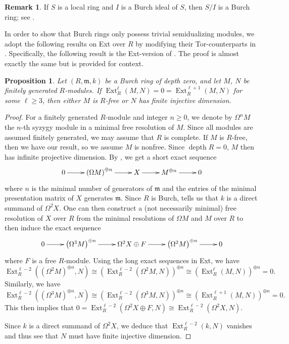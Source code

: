 \documentclass{amsart}
\newcommand{\depth}[1]{\operatorname{depth} {#1}}
\newcommand{\m}{\mathfrak{m}}
\DeclareMathOperator{\Ext}{Ext}
\theoremstyle{plain}
\newtheorem{prop}[theorem]{Proposition}
\theoremstyle{definition}
\newtheorem{remark}[theorem]{Remark}
\numberwithin{theorem}{section}
\numberwithin{equation}{section}
\numberwithin{equation}{theorem}
\begin{document}
\begin{remark} \label{burchideal}
If $S$ is a local ring and $I$ is a Burch ideal of $S$, then $S/I$ is a Burch ring; see \cite[Remark~2.9]{DKT}. 
\end{remark}


In order to show that Burch rings only possess trivial semidualizing modules, we adopt the following results on Ext over $R$ by modifying their Tor-counterparts in \cite{DKT}. Specifically, the following result is the Ext-version of \cite[Proposition 7.12]{DKT}. The proof is almost exactly the same but is provided for context.

\begin{prop}\label{prop:BurchExt}
Let $(R, \m, k)$ be a Burch ring of depth zero, and let $M$, $N$ be finitely generated $R$-modules. If $\Ext_R^{\ell}(M,N) = 0 = \Ext_R^{\ell + 1}(M,N)$ for some $\ell \geq 3$, then either $M$ is $R$-free or $N$ has finite injective dimension.
\end{prop}

\begin{proof}
For a finitely generated $R$-module and integer $n\ge 0$, we denote by $\Omega^n M$ the $n$-th syzygy module in a minimal free resolution of $M$. Since all modules are assumed finitely generated, we may assume that $R$ is complete. If $M$ is $R$-free, then we have our result, so we assume $M$ is nonfree. Since $\depth{R} = 0$, $M$ then has infinite projective dimension. By \cite[Lemma 7.4]{DKT}, we get a short exact sequence
\[\xymatrix{
0 \ar[r] & \left(\Omega M\right)^{\oplus n} \ar[r] & X \ar[r] & M^{\oplus n} \ar[r] & 0
}\]
where $n$ is the minimal number of generators of $\m$ and the entries of the minimal presentation matrix of $X$ generates $ \m$. Since $R$ is Burch, \cite[Proposition 4.2]{DKT} tells us that $k$ is a direct summand of $\Omega^2 X$. One can then construct a (not necessarily minimal) free resolution of $X$ over $R$ from the minimal resolutions of $\Omega M$ and $M$ over $R$ to then induce the exact sequence
\[\xymatrix{
0 \ar[r] & \left(\Omega^3 M \right)^{\oplus n} \ar[r] & \Omega^2 X \oplus F \ar[r] & \left(\Omega^2 M\right)^{\oplus n} \ar[r] & 0
}\]
where $F$ is a free $R$-module. Using the long exact sequences in Ext, we have \[\Ext_R^{\ell - 2}\left(\left(\Omega^2 M\right)^{\oplus n},N\right) \cong \left( \Ext_R^{\ell - 2} \left( \Omega^2 M, N\right) \right)^{\oplus n} \cong \left( \Ext_R^{\ell} \left(M, N \right) \right)^{\oplus n} = 0. \] Similarly, we have \[\Ext_R^{\ell - 2}\left(\left(\Omega^3 M\right)^{\oplus n},N\right) \cong \left( \Ext_R^{\ell - 2} \left( \Omega^3 M, N\right) \right)^{\oplus n} \cong \left( \Ext_R^{\ell + 1} \left(M, N \right) \right)^{\oplus n} = 0. \] This then implies that
$0 = \Ext_R^{\ell - 2}\left( \Omega^2 X \oplus F, N \right)\cong \Ext_R^{\ell - 2}\left( \Omega^2 X, N \right).$


Since $k$ is a direct summand of $\Omega^2 X$, we deduce that $\Ext_R^{\ell - 2} (k, N)$ vanishes and thus see that $N$ must have finite injective dimension.
\end{proof}
\end{document}
